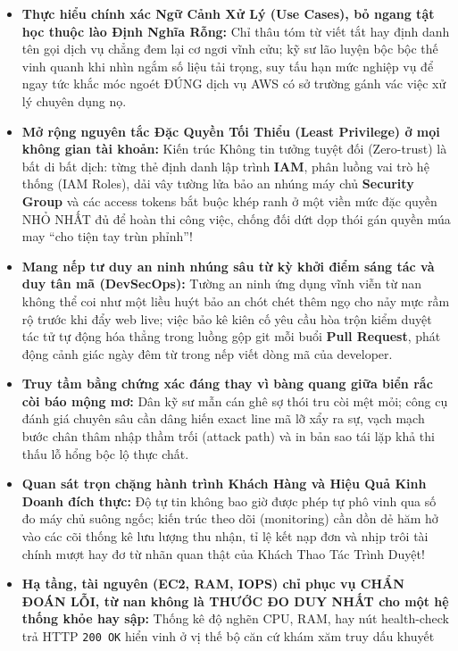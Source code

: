\begin{itemize}
\tightlist
\item
  \textbf{Thực hiểu chính xác Ngữ Cảnh Xử Lý (Use Cases), bỏ ngang tật
  học thuộc lào Định Nghĩa Rỗng:} Chỉ thâu tóm từ viết tắt hay định danh
  tên gọi dịch vụ chẳng đem lại cơ ngơi vĩnh cửu; kỹ sư lão luyện bộc
  bộc thế vinh quanh khi nhìn ngắm số liệu tải trọng, suy tấu hạn mức
  nghiệp vụ để ngay tức khắc móc ngoét ĐÚNG dịch vụ AWS có sở trường
  gánh vác việc xử lý chuyên dụng nọ.
\item
  \textbf{Mở rộng nguyên tắc Đặc Quyền Tối Thiểu (Least Privilege) ở mọi
  không gian tài khoản:} Kiến trúc Không tin tưởng tuyệt đối
  (Zero-trust) là bất di bất dịch: từng thẻ định danh lập trình
  \textbf{IAM}, phân luồng vai trò hệ thống (IAM Roles), dải vây tường
  lửa bảo an nhúng máy chủ \textbf{Security Group} và các access tokens
  bắt buộc khép ranh ở một viền mức đặc quyền NHỎ NHẤT đủ để hoàn thi
  công việc, chống đối dứt dọp thói gán quyền múa may ``cho tiện tay
  trùn phỉnh''!
\item
  \textbf{Mang nếp tư duy an ninh nhúng sâu từ kỳ khởi điểm sáng tác và
  duy tân mã (DevSecOps):} Tường an ninh ứng dụng vĩnh viễn từ nan không
  thể coi như một liều huýt bảo an chót chét thêm ngọ cho nảy mực rầm rộ
  trước khi đẩy web live; việc bảo kê kiên cố yêu cầu hòa trộn kiểm
  duyệt tác tử tự động hóa thẳng trong luồng gộp git mỗi buổi
  \textbf{Pull Request}, phát động cảnh giác ngày đêm từ trong nếp viết
  dòng mã của developer.
\item
  \textbf{Truy tầm bằng chứng xác đáng thay vì bàng quang giữa biển rắc
  còi báo mộng mơ:} Dân kỹ sư mẫn cán ghê sợ thói tru còi mệt mỏi; công
  cụ đánh giá chuyên sâu cần dâng hiến exact line mã lỡ xẩy ra sự, vạch
  mạch bước chân thâm nhập thầm trối (attack path) và in bản sao tái lặp
  khả thi thấu lỗ hổng bộc lộ thực chất.
\item
  \textbf{Quan sát trọn chặng hành trình Khách Hàng và Hiệu Quả Kinh
  Doanh đích thực:} Độ tự tin không bao giờ được phép tự phô vinh qua số
  đo máy chủ suông ngốc; kiến trúc theo dõi (monitoring) cần dồn dẻ hăm
  hở vào các cõi thống kê lưu lượng thu nhận, tỉ lệ kết nạp đơn và nhịp
  trôi tài chính mượt hay đơ từ nhãn quan thật của Khách Thao Tác Trình
  Duyệt!
\item
  \textbf{Hạ tầng, tài nguyên (EC2, RAM, IOPS) chỉ phục vụ CHẨN ĐOÁN
  LỖI, từ nan không là THƯỚC ĐO DUY NHẤT cho một hệ thống khỏe hay sập:}
  Thống kê độ nghẽn CPU, RAM, hay nút health-check trả HTTP
  \texttt{200\ OK} hiển vinh ở vị thế bộ căn cứ khám xăm truy dấu khuyết

\end{itemize}

